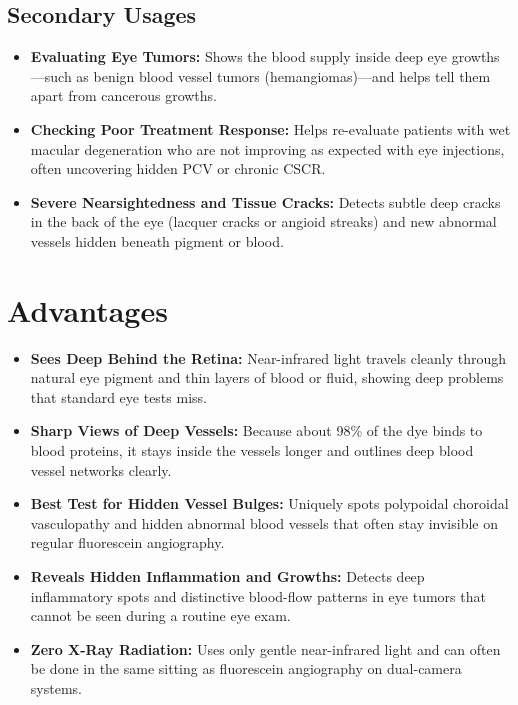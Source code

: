 \subsection{Secondary Usages}

\begin{itemize}
    \item \textbf{Evaluating Eye Tumors:} Shows the blood supply inside deep eye growths---such as benign blood vessel tumors (hemangiomas)---and helps tell them apart from cancerous growths.
    \item \textbf{Checking Poor Treatment Response:} Helps re-evaluate patients with wet macular degeneration who are not improving as expected with eye injections, often uncovering hidden PCV or chronic CSCR.
    \item \textbf{Severe Nearsightedness and Tissue Cracks:} Detects subtle deep cracks in the back of the eye (lacquer cracks or angioid streaks) and new abnormal vessels hidden beneath pigment or blood.
\end{itemize}

\section{Advantages}

\begin{itemize}
    \item \textbf{Sees Deep Behind the Retina:} Near-infrared light travels cleanly through natural eye pigment and thin layers of blood or fluid, showing deep problems that standard eye tests miss.
    \item \textbf{Sharp Views of Deep Vessels:} Because about 98\% of the dye binds to blood proteins, it stays inside the vessels longer and outlines deep blood vessel networks clearly.
    \item \textbf{Best Test for Hidden Vessel Bulges:} Uniquely spots polypoidal choroidal vasculopathy and hidden abnormal blood vessels that often stay invisible on regular fluorescein angiography.
    \item \textbf{Reveals Hidden Inflammation and Growths:} Detects deep inflammatory spots and distinctive blood-flow patterns in eye tumors that cannot be seen during a routine eye exam.
    \item \textbf{Zero X-Ray Radiation:} Uses only gentle near-infrared light and can often be done in the same sitting as fluorescein angiography on dual-camera systems.
\end{itemize}

